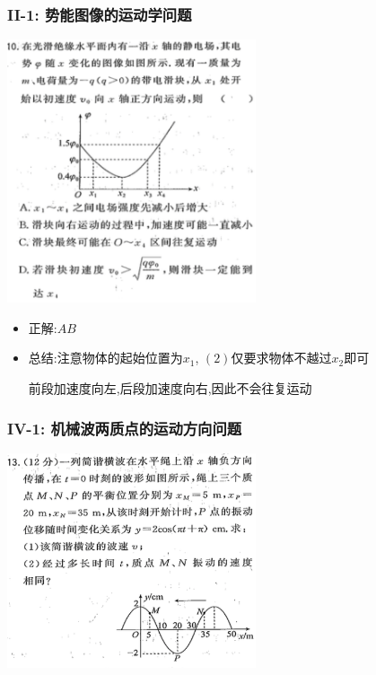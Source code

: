 \documentclass{article}
\begin{document}
\vspace{2em}

\subsubsection{II-1: 势能图像的运动学问题}
\includegraphics[width=0.55\textwidth,keepaspectratio]{./pictures/3.12-4.png}

\begin{itemize}
    \item 正解:\quad $AB$
    \item 总结:\quad 注意物体的起始位置为$x_{1}$, $(2)$仅要求物体不越过$x_{2}$即可
    
    \hspace{3.2em}前段加速度向左,后段加速度向右,因此不会往复运动
\end{itemize}

\vspace{2em}

\subsubsection{IV-1: 机械波两质点的运动方向问题}
\includegraphics[width=0.55\textwidth,keepaspectratio]{./pictures/3.12-5.png}
\end{document}
